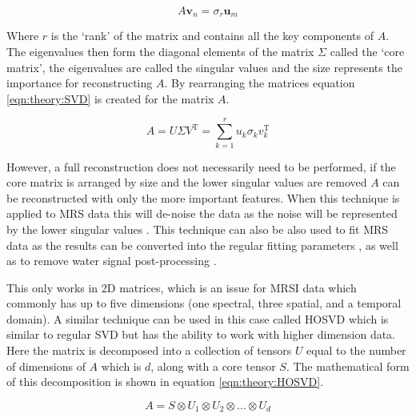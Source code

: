 \begin{equation}
    A \mathbf{v}_n = \sigma_r \mathbf{u}_m
\end{equation}

\noindent Where $r$ is the `rank' of the matrix and contains all the key components of $A$. The eigenvalues then form the diagonal elements of the matrix $\Sigma$ called the `core matrix', the eigenvalues are called the singular values and the size represents the importance for reconstructing $A$. By rearranging the matrices equation \ref{eqn:theory:SVD} is created for the matrix $A$.

\begin{equation}
    A = U\Sigma V^\textrm{T} = \sum_{k=1}^{r} u_k\sigma_kv_k^\textrm{T}
    \label{eqn:theory:SVD}
\end{equation}

\noindent However, a full reconstruction does not necessarily need to be performed, if the core matrix is arranged by size and the lower singular values are removed $A$ can be reconstructed with only the more important features. When this technique is applied to \ac{MRS} data this will de-noise the data as the noise will be represented by the lower singular values \cite{Brender2019DynamicHyperpolarization}. This technique can also be also used to fit \ac{MRS} data as the results can be converted into the regular fitting parameters \cite{Pijnappel1992SVD-basedSignals}, as well as to remove water signal post-processing \cite{Cabanes2001OptimizationBrain}.

This only works in 2D matrices, which is an issue for \ac{MRSI} data which commonly has up to five dimensions (one spectral, three spatial, and a temporal domain). A similar technique can be used in this case called \ac{HOSVD} which is similar to regular \ac{SVD} but has the ability to work with higher dimension data. Here the matrix is decomposed into a collection of tensors $U$ equal to the number of dimensions of $A$ which is $d$, along with a core tensor $S$. The mathematical form of this decomposition is shown in equation \ref{eqn:theory:HOSVD}.

\begin{equation}
    A = S \otimes U_1 \otimes U_2 \otimes ... \otimes U_d
    \label{eqn:theory:HOSVD}
\end{equation}

